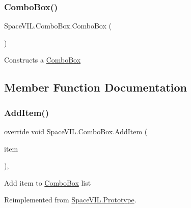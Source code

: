 \subsubsection{\texorpdfstring{Combo\+Box()}{ComboBox()}}
{\footnotesize\ttfamily Space\+V\+I\+L.\+Combo\+Box.\+Combo\+Box (\begin{DoxyParamCaption}{ }\end{DoxyParamCaption})\hspace{0.3cm}{\ttfamily [inline]}}



Constructs a \mbox{\hyperlink{class_space_v_i_l_1_1_combo_box}{Combo\+Box}} 



\subsection{Member Function Documentation}
\mbox{\label{class_space_v_i_l_1_1_combo_box_a05b737bc6384aa858fe63ffe5cc03afd}} 
\subsubsection{\texorpdfstring{Add\+Item()}{AddItem()}}
{\footnotesize\ttfamily override void Space\+V\+I\+L.\+Combo\+Box.\+Add\+Item (\begin{DoxyParamCaption}\item[{\mbox{\hyperlink{interface_space_v_i_l_1_1_core_1_1_i_base_item}{I\+Base\+Item}}}]{item }\end{DoxyParamCaption})\hspace{0.3cm}{\ttfamily [inline]}, {\ttfamily [virtual]}}



Add item to \mbox{\hyperlink{class_space_v_i_l_1_1_combo_box}{Combo\+Box}} list 



Reimplemented from \mbox{\hyperlink{class_space_v_i_l_1_1_prototype}{Space\+V\+I\+L.\+Prototype}}.

\mbox{\label{class_space_v_i_l_1_1_combo_box_af43d1181237882f92c25cf60cb67233a}} 
